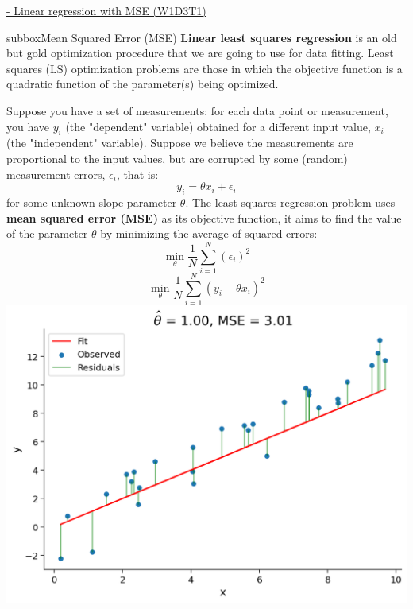 \begin{textbox}{\href{https://compneuro.neuromatch.io/tutorials/W1D3_ModelFitting/chapter_title.html}{ -  Linear regression with MSE (W1D3T1)}}
\begin{subbox}{subbox}{Mean Squared Error (MSE)}
\scriptsize
\textbf{Linear least squares regression} is an old but gold  optimization procedure that we are going to use for data fitting. Least squares (LS) optimization problems are those in which the objective function is a quadratic function of the
parameter(s) being optimized.

Suppose you have a set of measurements: for each data point or measurement, you have $y_{i}$ (the "dependent" variable) obtained for a different input value, $x_{i}$ (the "independent" variable).  Suppose we believe the measurements are proportional to the input values, but are corrupted by some (random) measurement errors, $\epsilon_{i}$, that is:
\begin{equation}
y_{i}= \theta x_{i}+\epsilon_{i}
\end{equation}
for some unknown slope parameter $\theta.$ The least squares regression problem uses \textbf{mean squared error (MSE)} as its objective function, it aims to find the value of the parameter $\theta$ by minimizing the average of squared errors:
\begin{equation}
\min _{\theta} \frac{1}{N}\sum_{i=1}^{N}\left(\epsilon_{i}\right)^{2}
\end{equation}
\begin{equation}
\min _{\theta} \frac{1}{N}\sum_{i=1}^{N}\left(y_{i}-\theta x_{i}\right)^{2}
\end{equation}
\centering
\includegraphics[scale=0.15]{Figures/ModelFitting/MFFigure1.png}

\end{subbox}
\end{textbox}
